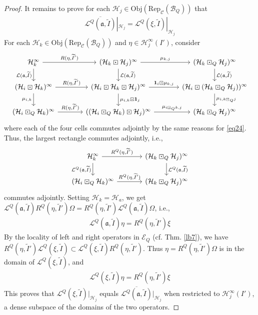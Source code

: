 \documentclass[11pt,b5paper,notitlepage]{article}
\theoremstyle{definition}
\theoremstyle{plain}
\newcommand{\fk}{\mathfrak}
\newcommand{\mc}{\mathcal}
\newcommand{\wtd}{\widetilde}
\newcommand{\ovl}{\overline}
\newcommand{\idt}{\mathbf{1}}
\newcommand{\Rep}{\mathrm{Rep}}
\newcommand{\scr}{\mathscr}
\newcommand{\Obj}{\mathrm{Obj}}
\numberwithin{equation}{section}
\begin{document}
\begin{proof}
It remains to prove for each $\mc H_j\in\Obj(\Rep_{\scr C}(\mc B_Q))$ that
\begin{align}
\ovl{\mc L^Q(\fk a,\wtd I)}|_{\mc H_j}=\scr L^Q(\xi,\wtd I)|_{\mc H_j} \label{eq28}
\end{align}
For each $\mc H_k\in\Obj(\Rep_{\scr C}(\mc B_Q))$ and $\eta\in\mc H_j^\infty(I')$, consider 
\begin{equation}\label{eq26}
\begin{tikzcd}[column sep=large]
\mc H_k^\infty \arrow[r,"{R(\eta,\wtd I')}"] \arrow[d,"{\mc L(\fk a,\wtd I)}"'] & (\mc H_k\boxdot\mc H_j)^\infty \arrow[r,"\mu_{k,j}"] \arrow[d,"{\mc L(\fk a,\wtd I)}"] & (\mc H_k\boxdot_Q\mc H_j)^\infty \arrow[d,"{\mc L(\fk a,\wtd I)}"] \\
(\mc H_i\boxdot\mc H_k)^\infty \arrow[r,"{R(\eta,\wtd I')}"] \arrow[d,"\mu_{i,k}"'] & (\mc H_i\boxdot\mc H_k\boxdot\mc H_j)^\infty \arrow[r,"\idt_i\boxdot\mu_{k,j}"] \arrow[d,"\mu_{i,k}\boxdot\idt_j"] & (\mc H_i\boxdot(\mc H_k\boxdot_Q\mc H_j))^\infty \arrow[d,"{\mu_{i,k\boxdot_Q j}}"] \\
(\mc H_i\boxdot_Q\mc H_k)^\infty \arrow[r,"{R(\eta,\wtd I')}"]           & ((\mc H_i\boxdot_Q\mc H_k)\boxdot\mc H_j)^\infty \arrow[r,"\mu_{i\boxdot_Qk,j}"]           & (\mc H_k\boxdot_Q\mc H_j)^\infty          
\end{tikzcd}
\end{equation}
where each of the four cells commutes adjointly by the same reasons for \eqref{eq24}. Thus, the largest rectangle commutes adjointly, i.e., 
\begin{equation}\label{eq27}
\begin{tikzcd}[column sep=large]
\mc H_k^\infty \arrow[r,"{R^Q(\eta,\wtd I')}"] \arrow[d,"{\mc L^Q(\fk a,\wtd I)}"'] & (\mc H_k\boxdot_Q\mc H_j)^\infty\arrow[d,"{\mc L^Q(\fk a,\wtd I)}"] \\
(\mc H_i\boxdot_Q\mc H_k)^\infty \arrow[r,"{R^Q(\eta,\wtd I')}"] &(\mc H_k\boxdot_Q\mc H_j)^\infty
\end{tikzcd}
\end{equation}
commutes adjointly. Setting $\mc H_k=\mc H_a$, we get $\mc L^Q(\fk a,\wtd I)R^Q(\eta,\wtd I')\Omega=R^Q(\eta,\wtd I')\mc L^Q(\fk a,\wtd I)\Omega$, i.e., 
\begin{align*}
\mc L^Q(\fk a,\wtd I)\eta=R^Q(\eta,\wtd I')\xi
\end{align*}
By the locality of left and right operators in $\scr E_Q$ (cf. Thm. \ref{lb7}), we have $R^Q(\eta,\wtd I')\scr L^Q(\xi,\wtd I)\subset \scr L^Q(\xi,\wtd I)R^Q(\eta,\wtd I')$. Thus $\eta=R^Q(\eta,\wtd I')\Omega$ is in the domain of $\scr L^Q(\xi,\wtd I)$, and 
\begin{align}
\scr L^Q(\xi,\wtd I)\eta=R^Q(\eta,\wtd I')\xi\label{eq29}
\end{align}
This proves that $\scr L^Q(\xi,\wtd I)|_{\mc H_j}$ equals $\ovl{\mc L^Q(\fk a,\wtd I)}|_{\mc H_j}$ when restricted to $\mc H_j^\infty(I')$, a dense subspace of the domains of the two operators. 


\end{proof}
\end{document}
